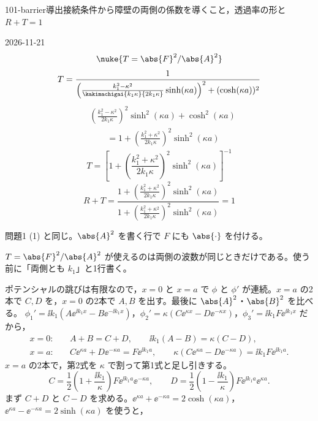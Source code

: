 \documentclass[uplatex,dvipdfmx,a4paper,11pt]{jsarticle}
\begin{document}
\begin{mondai}{101-barrier}{導出}{接続条件から障壁の両側の係数を導くこと，透過率の形と $R+T=1$}
\begin{kotaeutsushi}{2026-11-21}
\[ \nuke{T=\abs{F}^{2}/\abs{A}^{2}} \]
\[ T=\frac{1}{\left(\frac{k_{1}^{2}-\kappa^{2}}{\kakimachigai{k_{1}\kappa}{2k_{1}\kappa}}\sinh(\kappa a)\right)^{2}+(\cosh(\kappa a))^{2}} \]
\begin{align*}
&\left(\frac{k_{1}^{2}-\kappa^{2}}{2k_{1}\kappa}\right)^{2}\sinh^{2}(\kappa a)+\cosh^{2}(\kappa a)\\
&\qquad=1+\left(\frac{k_{1}^{2}+\kappa^{2}}{2k_{1}\kappa}\right)^{2}\sinh^{2}(\kappa a)
\end{align*}
\[ T=\left[1+\left(\frac{k_{1}^{2}+\kappa^{2}}{2k_{1}\kappa}\right)^{2}\sinh^{2}(\kappa a)\right]^{-1} \]
\[ R+T=\frac{1+\left(\frac{k_{1}^{2}+\kappa^{2}}{2k_{1}\kappa}\right)^{2}\sinh^{2}(\kappa a)}{1+\left(\frac{k_{1}^{2}+\kappa^{2}}{2k_{1}\kappa}\right)^{2}\sinh^{2}(\kappa a)}=1 \]
\end{kotaeutsushi}
\begin{kizuki}
\item 問題1 (1) と同じ。$\abs{A}^{2}$ を書く行で $F$ にも $\abs{\cdot}$ を付ける。
\item $T=\abs{F}^{2}/\abs{A}^{2}$ が使えるのは両側の波数が同じときだけである。使う前に「両側とも $k_{1}$」と1行書く。
\end{kizuki}
\begin{tadashii}
\houshin ポテンシャルの跳びは有限なので，$x=0$ と $x=a$ で $\phi$ と $\phi'$ が連続。$x=a$ の2本で $C,D$ を，$x=0$ の2本で $A,B$ を出す。最後に $\abs{A}^{2}$・$\abs{B}^{2}$ を比べる。
\keisan {} $\phi_{1}'=\ii k_{1}(A\ee^{\ii k_{1}x}-B\ee^{-\ii k_{1}x})$，$\phi_{2}'=\kappa(C\ee^{\kappa x}-D\ee^{-\kappa x})$，$\phi_{3}'=\ii k_{1}F\ee^{\ii k_{1}x}$ だから，
\begin{align*}
  x=0:&\quad A+B=C+D, \qquad \ii k_{1}(A-B)=\kappa(C-D),\\
  x=a:&\quad C\ee^{\kappa a}+D\ee^{-\kappa a}=F\ee^{\ii k_{1}a}, \qquad \kappa(C\ee^{\kappa a}-D\ee^{-\kappa a})=\ii k_{1}F\ee^{\ii k_{1}a} .
\end{align*}
 $x=a$ の2本で，第2式を $\kappa$ で割って第1式と足し引きする。
\[ C=\frac{1}{2}\left(1+\frac{\ii k_{1}}{\kappa}\right)F\ee^{\ii k_{1}a}\ee^{-\kappa a},\qquad D=\frac{1}{2}\left(1-\frac{\ii k_{1}}{\kappa}\right)F\ee^{\ii k_{1}a}\ee^{\kappa a} . \]
 まず $C+D$ と $C-D$ を求める。$\ee^{\kappa a}+\ee^{-\kappa a}=2\cosh(\kappa a)$，$\ee^{\kappa a}-\ee^{-\kappa a}=2\sinh(\kappa a)$ を使うと，

\end{tadashii}
\end{mondai}
\end{document}
